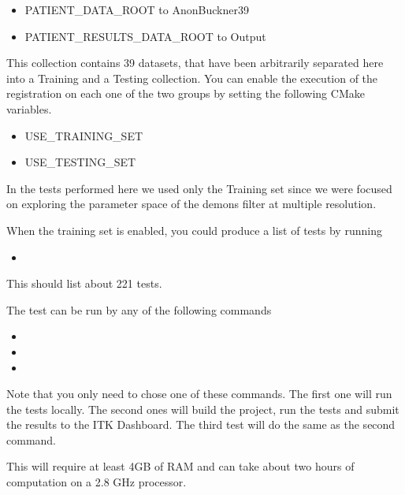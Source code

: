 \documentclass{InsightArticle}
\begin{document}
\begin{itemize}
\item PATIENT\_DATA\_ROOT to AnonBuckner39
\item PATIENT\_RESULTS\_DATA\_ROOT to Output
\end{itemize}

This collection contains 39 datasets, that have been arbitrarily separated here
into a Training and a Testing collection. You can enable the execution of the
registration on each one of the two groups by setting the following CMake
variables.

\begin{itemize}
\item USE\_TRAINING\_SET
\item USE\_TESTING\_SET
\end{itemize}

In the tests performed here we used only the Training set since we were 
focused on exploring the parameter space of the demons filter at multiple
resolution.

When the training set is enabled, you could produce a list of tests by
running

\begin{itemize}
\item {}
\end{itemize}

This should list about 221 tests.

The test can be run by any of the following commands


\begin{itemize}
\item {}
\item {}
\item {}
\end{itemize}

Note that you only need to chose one of these commands. The first one will run
the tests locally. The second ones will build the project, run the tests and
submit the results to the ITK Dashboard. The third test will do the same as the
second command.

This will require at least 4GB of RAM and can take about two hours of
computation on a 2.8 GHz processor.

\clearpage


%
%



\end{document}
